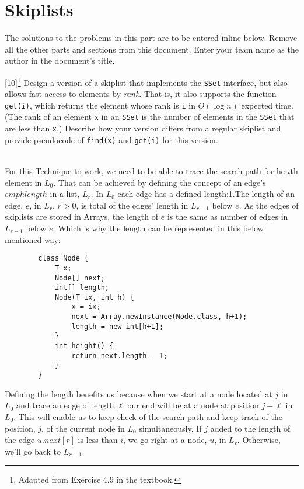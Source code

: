 \documentclass[addpoints]{exam}
\begin{document}
\newpage
\part{Skiplists}

The solutions to the problems in this part are to be entered inline below. Remove all the other parts and sections from this document. Enter your team name as the author in the document's title.

\begin{questions}

  [10]\footnote{Adapted from Exercise 4.9 in the textbook.}
  Design a version of a skiplist that implements the \texttt{SSet} interface, but also allows fast access to elements by \textit{rank}. That is, it also supports the function \texttt{get(i)}, which returns the element whose rank is \texttt{i} in $O(\log n)$ expected time. (The rank of an element \texttt{x} in an \texttt{SSet} is the number of elements in the \texttt{SSet} that are less than \texttt{x}.)
  Describe how your version differs from a regular skiplist and provide pseudocode of \texttt{find(x)} and \texttt{get(i)} for this version.
  \begin{solution}
    \\
    For this Technique to work, we need to be able to trace the search path for he $i$th element in $L_0$. That can be achieved by defining the concept of an edge's $emphlength$ in a list, $L_r$.
    In $L_0$ each edge has a defined length:1.The length of an edge, $e$, in $L_r$, $r>0$, is total of the edges' length in $L_{r-1}$ below $e$. As the edges of skiplists are stored in Arrays, the length of $e$ is the same as number of edges in $L_{r-1}$ below $e$. Which is why the length can be represented in this below mentioned way:
    
    \begin{verbatim}
        class Node {
            T x;
            Node[] next;
            int[] length;
            Node(T ix, int h) {
                x = ix;
                next = Array.newInstance(Node.class, h+1);
                length = new int[h+1];
            }
            int height() {
                return next.length - 1;
            }
        }
    \end{verbatim}
    Defining the length benefits us because when we start at a node located at $j$ in $L_0$ and trace an edge of length $\ell$ our  end will be at a node at position $j+\ell$ in $L_0$. This will enable us to keep check of the search path and keep track of the position, $j$, of the current node in $L_0$ simultaneously. If $j$ added to the length of the edge $u.next[r]$ is less than $i$, we go right at a node, $u$, in $L_r$. Otherwise, we'll go back to $L_{r-1}$.
    

\end{solution}
\end{questions}
\end{document}
